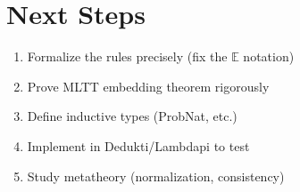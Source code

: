 \documentclass[11pt,a4paper]{article}
\newcommand{\E}{\mathbb{E}}
\begin{document}
\section{Next Steps}

\begin{enumerate}
    \item Formalize the rules precisely (fix the $\E$ notation)
    \item Prove MLTT embedding theorem rigorously
    \item Define inductive types (ProbNat, etc.)
    \item Implement in Dedukti/Lambdapi to test
    \item Study metatheory (normalization, consistency)
\end{enumerate}
\end{document}
